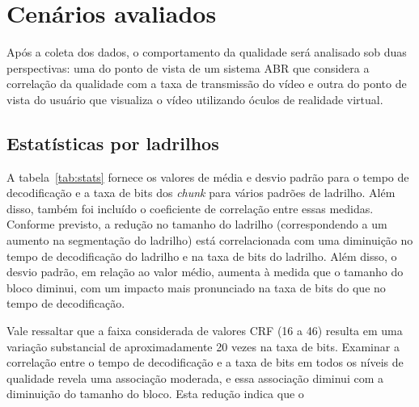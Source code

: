 \section{Cenários avaliados}

Após a coleta dos dados, o comportamento da qualidade será analisado sob duas perspectivas: uma do ponto de vista de um sistema ABR que considera a correlação da qualidade com a taxa de transmissão do vídeo e outra do ponto de vista do usuário que visualiza o vídeo utilizando óculos de realidade virtual. 

\subsection{Estatísticas por ladrilhos}

A tabela~\ref{tab:stats} fornece os valores de média e desvio padrão para o tempo de decodificação e a taxa de bits dos \textit{chunk} para vários padrões de ladrilho. Além disso, também foi incluído o coeficiente de correlação entre essas medidas. Conforme previsto, a redução no tamanho do ladrilho (correspondendo a um aumento na segmentação do ladrilho) está correlacionada com uma diminuição no tempo de decodificação do ladrilho e na taxa de bits do ladrilho. Além disso, o desvio padrão, em relação ao valor médio, aumenta à medida que o tamanho do bloco diminui, com um impacto mais pronunciado na taxa de bits do que no tempo de decodificação.

Vale ressaltar que a faixa considerada de valores CRF (16 a 46) resulta em uma variação substancial de aproximadamente 20 vezes na taxa de bits. Examinar a correlação entre o tempo de decodificação e a taxa de bits em todos os níveis de qualidade revela uma associação moderada, e essa associação diminui com a diminuição do tamanho do bloco. Esta redução indica que o 

